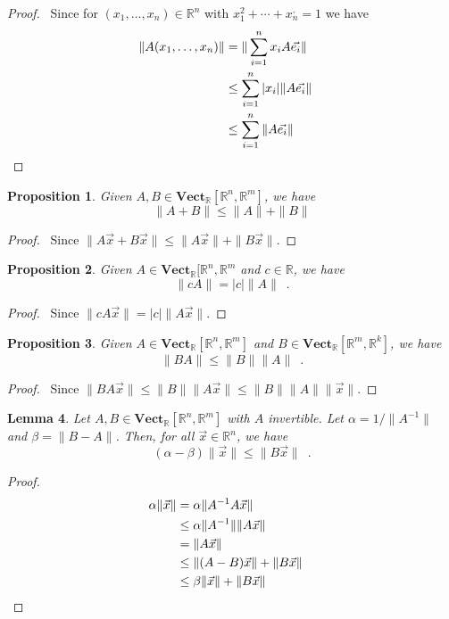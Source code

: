 \documentclass{book}
\let\qed\relax
\newtheorem{prop}{Proposition}[chapter]
\newtheorem{lm}[prop]{Lemma}
\theoremstyle{definition}
\begin{document}
\begin{proof}
\pf\ Since for $(x_1, \ldots, x_n) \in \mathbb{R}^n$ with $x_1^2 + \cdots + x_n^, = 1$ we have
\begin{align*}
\| A (x_1, \ldots, x_n) \| & = \| \sum_{i=1}^n x_i A \vec{e_i} \| \\
& \leq \sum_{i=1}^n |x_i| \| A \vec{e_i} \| \\
& \leq \sum_{i=1}^n \| A \vec{e_i} \| & \qed
\end{align*}
\end{proof}

\begin{prop}
Given $A,B \in \mathbf{Vect}_\mathbb{R}[\mathbb{R}^n, \mathbb{R}^m]$, we have
\[ \| A + B \| \leq \| A \| + \| B \| \]
\end{prop}

\begin{proof}
\pf\ Since $\| A \vec{x} + B \vec{x} \| \leq \| A \vec{x} \| + \| B \vec{x} \|$. \qed
\end{proof}

\begin{prop}
Given $A \in \mathbf{Vect}_\mathbb{R}[\mathbb{R}^n, \mathbb{R}^m$ and $c \in \mathbb{R}$, we have
\[ \| c A \| = |c| \| A \| \enspace . \]
\end{prop}

\begin{proof}
\pf\ Since $\| c A \vec{x} \| = |c| \| A \vec{x} \|$. \qed
\end{proof}

\begin{prop}
Given $A \in \mathbf{Vect}_\mathbb{R}[\mathbb{R}^n, \mathbb{R}^m]$ and $B \in \mathbf{Vect}_\mathbb{R}[\mathbb{R}^m, \mathbb{R}^k]$, we have
\[ \| BA \| \leq \| B \| \| A \| \enspace . \]
\end{prop}

\begin{proof}
\pf\ Since $\| BA \vec{x} \| \leq \| B \| \| A \vec{x} \| \leq \| B \| \| A \| \| \vec{x} \|$. \qed
\end{proof}

\begin{lm}
\label{lm:pre_norm_inverse}
Let $A,B \in \mathbf{Vect}_\mathbb{R}[\mathbb{R}^n, \mathbb{R}^m]$ with $A$ invertible. Let $\alpha = 1/\| A^{-1}\|$ and $\beta = \| B - A \|$. Then, for all $\vec{x} \in \mathbb{R}^n$, we have
\[ (\alpha - \beta) \| \vec{x} \| \leq \| B \vec{x} \| \enspace . \]
\end{lm}

\begin{proof}
	\pf
	\begin{align*}
		\alpha \| \vec{x} \|
		& = \alpha \| A^{-1} A \vec{x} \| \\
		& \leq \alpha \| A^{-1} \| \| A \vec{x} \| \\
		& = \| A \vec{x} \| \\
		& \leq \| (A - B) \vec{x} \| + \| B \vec{x} \| \\
		& \leq \beta \| \vec{x} \| + \| B \vec{x} \| & \qed
	\end{align*}
\end{proof}
\end{document}
